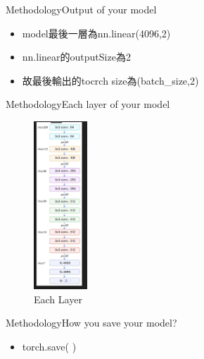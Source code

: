 \documentclass{beamer}
\begin{document}
\begin{frame}{Methodology}{Output of your model }
\begin{CJK*}{UTF8}{bsmi}
  \begin{itemize}
  \item {
model最後一層為nn.linear(4096,2)
  }
 \item {
nn.linear的outputSize為2
  }
 \item {
故最後輸出的tocrch size為(batch\_size,2)
  }
  \end{itemize}
\end{CJK*}
\end{frame}

\begin{frame}{Methodology}{Each layer of your model}
\begin{CJK*}{UTF8}{bsmi}
\begin{figure}[h]
\begin{center}
\includegraphics[width=2cm]{Layer.jpg} 
\end{center} 
\label{fig:2} 
\caption{Each Layer} 
\end{figure}
\end{CJK*}
\end{frame}

\begin{frame}{Methodology}{How you save your model?}
\begin{CJK*}{UTF8}{bsmi}
  \begin{itemize}
  \item {
torch.save( )\\
  }
  \end{itemize}
\end{CJK*}  
\end{frame}
\end{document}
